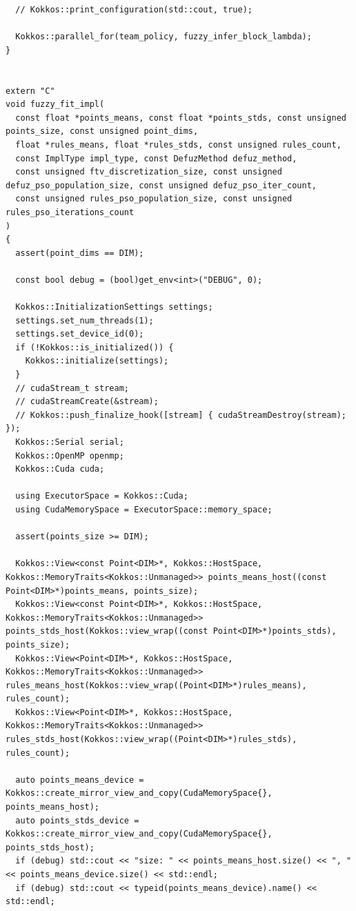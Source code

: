 \begin{verbatim}
  // Kokkos::print_configuration(std::cout, true);

  Kokkos::parallel_for(team_policy, fuzzy_infer_block_lambda);
}


extern "C"
void fuzzy_fit_impl(
  const float *points_means, const float *points_stds, const unsigned points_size, const unsigned point_dims,
  float *rules_means, float *rules_stds, const unsigned rules_count,
  const ImplType impl_type, const DefuzMethod defuz_method,
  const unsigned ftv_discretization_size, const unsigned defuz_pso_population_size, const unsigned defuz_pso_iter_count,
  const unsigned rules_pso_population_size, const unsigned rules_pso_iterations_count
)
{
  assert(point_dims == DIM);

  const bool debug = (bool)get_env<int>("DEBUG", 0);

  Kokkos::InitializationSettings settings;
  settings.set_num_threads(1);
  settings.set_device_id(0);
  if (!Kokkos::is_initialized()) {
    Kokkos::initialize(settings);
  }
  // cudaStream_t stream;
  // cudaStreamCreate(&stream);
  // Kokkos::push_finalize_hook([stream] { cudaStreamDestroy(stream); });
  Kokkos::Serial serial;
  Kokkos::OpenMP openmp;
  Kokkos::Cuda cuda;

  using ExecutorSpace = Kokkos::Cuda;
  using CudaMemorySpace = ExecutorSpace::memory_space;

  assert(points_size >= DIM);

  Kokkos::View<const Point<DIM>*, Kokkos::HostSpace, Kokkos::MemoryTraits<Kokkos::Unmanaged>> points_means_host((const Point<DIM>*)points_means, points_size);
  Kokkos::View<const Point<DIM>*, Kokkos::HostSpace, Kokkos::MemoryTraits<Kokkos::Unmanaged>> points_stds_host(Kokkos::view_wrap((const Point<DIM>*)points_stds), points_size);
  Kokkos::View<Point<DIM>*, Kokkos::HostSpace, Kokkos::MemoryTraits<Kokkos::Unmanaged>> rules_means_host(Kokkos::view_wrap((Point<DIM>*)rules_means), rules_count);
  Kokkos::View<Point<DIM>*, Kokkos::HostSpace, Kokkos::MemoryTraits<Kokkos::Unmanaged>> rules_stds_host(Kokkos::view_wrap((Point<DIM>*)rules_stds), rules_count);

  auto points_means_device = Kokkos::create_mirror_view_and_copy(CudaMemorySpace{}, points_means_host);
  auto points_stds_device = Kokkos::create_mirror_view_and_copy(CudaMemorySpace{}, points_stds_host);
  if (debug) std::cout << "size: " << points_means_host.size() << ", " << points_means_device.size() << std::endl;
  if (debug) std::cout << typeid(points_means_device).name() << std::endl;


\end{verbatim}
